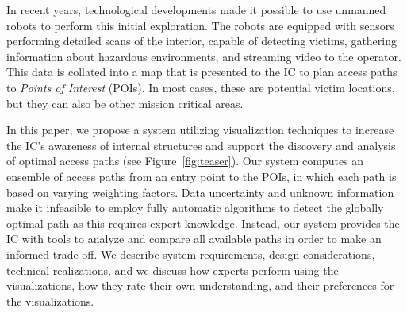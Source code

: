 \documentclass{egpubl}
\begin{document}
In recent years, technological developments made it possible to use unmanned robots to perform this initial exploration. The robots are equipped with sensors performing detailed scans of the interior, capable of detecting victims, gathering information about hazardous environments, and streaming video to the operator. This data is collated into a map that is presented to the IC to plan access paths to \emph{Points of Interest} (POIs). In most cases, these are potential victim locations, but they can also be other mission critical areas.

In this paper, we propose a system utilizing visualization techniques to increase the IC's awareness of internal structures and support the discovery and analysis of optimal access paths (see Figure~\ref{fig:teaser}). Our system computes an ensemble of access paths from an entry point to the POIs, in which each path is based on varying weighting factors. Data uncertainty and unknown information make it infeasible to employ fully automatic algorithms to detect the globally optimal path as this requires expert knowledge. Instead, our system provides the IC with tools to analyze and compare all available paths in order to make an informed trade-off. We describe system requirements, design considerations, technical realizations, and we discuss how experts perform using the visualizations, how they rate their own understanding, and their preferences for the visualizations.


\end{document}
